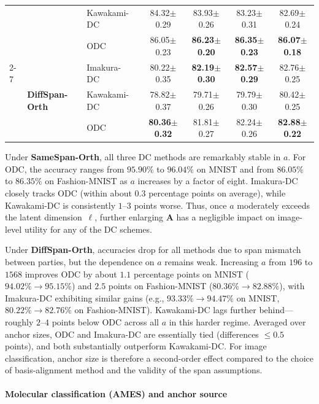 \documentclass[final,3p,times]{elsarticle}
\theoremstyle{plain}
\newcommand{\matr}[1]{\bm{#1}}        %
\begin{document}
\begin{table}[t]
{\begin{tabular}{lllcccc}
      &  & Kawakami-DC~\cite{KawakamiDC} & 84.32$\pm$0.29 & 83.93$\pm$0.26 & 83.23$\pm$0.31 & 82.69$\pm$0.24 \\
      &  & ODC  & 86.05$\pm$0.23 & \textbf{86.23$\pm$0.20} & \textbf{86.35$\pm$0.23} & \textbf{86.07$\pm$0.18} \\
    \cmidrule(lr){2-7}
      & \multirow{3}{*}{\textbf{DiffSpan-Orth}}
        & Imakura-DC~\cite{DCframework1}   & 80.22$\pm$0.35 & \textbf{82.19$\pm$0.30} & \textbf{82.57$\pm$0.29} & 82.76$\pm$0.25 \\
      &  & Kawakami-DC~\cite{KawakamiDC} & 78.82$\pm$0.37 & 79.71$\pm$0.26 & 79.79$\pm$0.30 & 80.42$\pm$0.25 \\
      &  & ODC  & \textbf{80.36$\pm$0.32} & 81.81$\pm$0.27 & 82.24$\pm$0.26 & \textbf{82.88$\pm$0.22} \\
    \bottomrule
  \end{tabular}
  }
\end{table}


Under \textbf{SameSpan-Orth}, all three DC methods are remarkably stable in $a$. For ODC, the accuracy ranges from $95.90\%$ to $96.04\%$ on MNIST and from $86.05\%$ to $86.35\%$ on Fashion-MNIST as $a$ increases by a factor of eight. Imakura-DC closely tracks ODC (within about $0.3$ percentage points on average), while Kawakami-DC is consistently $1$–$3$ points worse. Thus, once $a$ moderately exceeds the latent dimension~$\ell$, further enlarging $\matr{A}$ has a negligible impact on image-level utility for any of the DC schemes.

Under \textbf{DiffSpan-Orth}, accuracies drop for all methods due to span mismatch between parties, but the dependence on $a$ remains weak. Increasing $a$ from $196$ to $1568$ improves ODC by about $1.1$ percentage points on MNIST ($94.02\%\to95.15\%$) and $2.5$ points on Fashion-MNIST ($80.36\%\to82.88\%$), with Imakura-DC exhibiting similar gains (e.g., $93.33\%\to94.47\%$ on MNIST, $80.22\%\to82.76\%$ on Fashion-MNIST). Kawakami-DC lags further behind—roughly $2$–$4$ points below ODC across all $a$ in this harder regime. Averaged over anchor sizes, ODC and Imakura-DC are essentially tied (differences $\leq 0.5$ points), and both substantially outperform Kawakami-DC. For image classification, anchor size is therefore a second-order effect compared to the choice of basis-alignment method and the validity of the span assumptions.

\paragraph{Molecular classification (AMES) and anchor source}
\end{document}
